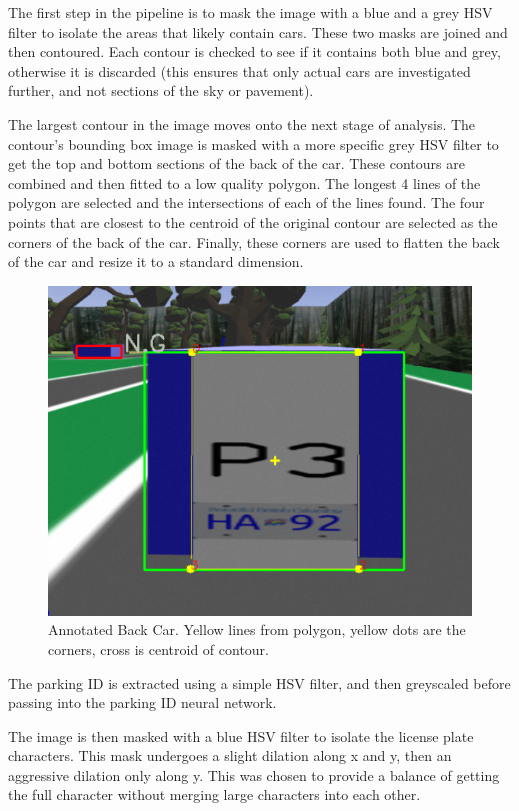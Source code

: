 \documentclass[titlepage, twocolumn]{article}
\begin{document}
The first step in the pipeline is to mask the image with a blue and a grey HSV filter to isolate the areas that likely contain cars. These two masks are joined and then contoured. Each contour is checked to see if it contains both blue and grey, otherwise it is discarded (this ensures that only actual cars are investigated further, and not sections of the sky or pavement). 

The largest contour in the image moves onto the next stage of analysis. The contour's bounding box image is masked with a more specific grey HSV filter to get the top and bottom sections of the back of the car. These contours are combined and then fitted to a low quality polygon. The longest 4 lines of the polygon are selected and the intersections of each of the lines found. The four points that are closest to the centroid of the original contour are selected as the corners of the back of the car. Finally, these corners are used to flatten the back of the car and resize it to a standard dimension.

\begin{figure}
\centering
\includegraphics[width=0.8\linewidth]{Annotated back car.png}
\caption{Annotated Back Car. Yellow lines from polygon, yellow dots are the corners, cross is centroid of contour.}
\label{fig:annotatedbackcar}
\end{figure}

The parking ID is extracted using a simple HSV filter, and then greyscaled before passing into the parking ID neural network.

The image is then masked with a blue HSV filter to isolate the license plate characters. This mask undergoes a slight dilation along x and y, then an aggressive dilation only along y. This was chosen to provide a balance of getting the full character without merging large characters into each other. 
\end{document}
